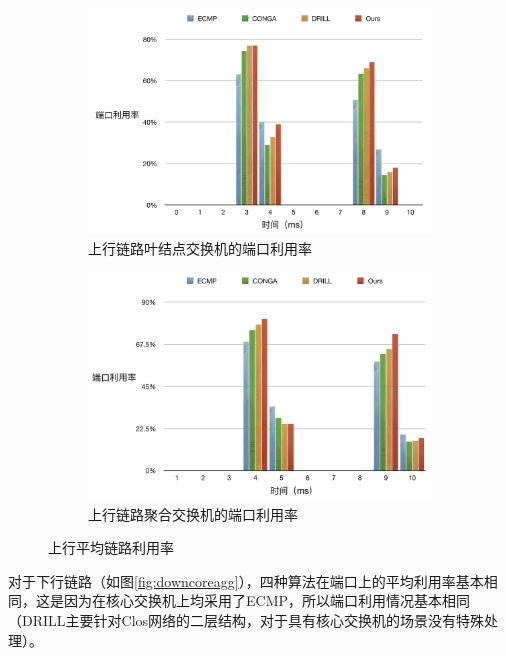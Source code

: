 \begin{figure}[htb!]
\centering
\begin{subfigure}{0.47\textwidth}
     \includegraphics[width=\textwidth]{figure/upleaf.png}
     \caption{上行链路叶结点交换机的端口利用率}
\end{subfigure}\hspace{2em}
\begin{subfigure}{0.47\textwidth}
    \includegraphics[width=\textwidth]{figure/upagg1.png}
    \caption{上行链路聚合交换机的端口利用率}

\end{subfigure}%
\caption{上行平均链路利用率}
\label{fig:upleafagg}
\end{figure}


对于下行链路（如图\ref{fig:downcoreagg}），四种算法在端口上的平均利用率基本相同，这是因为在核心交换机上均采用了ECMP，所以端口利用情况基本相同（DRILL主要针对Clos网络的二层结构，对于具有核心交换机的场景没有特殊处理）。


